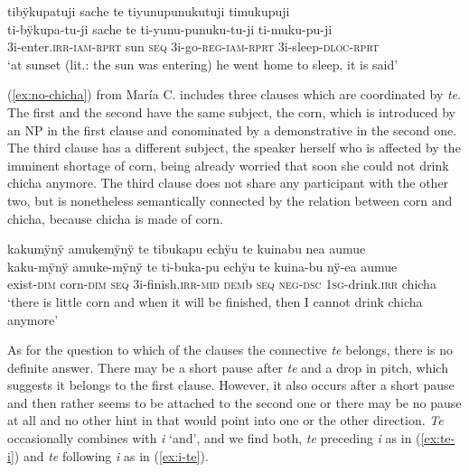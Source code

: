 \ea\label{ex:sunset}
\begingl
\glpreamble tibÿkupatuji sache te tiyunupunukutuji timukupuji\\
\gla ti-bÿkupa-tu-ji sache te ti-yunu-punuku-tu-ji ti-muku-pu-ji\\
\glb 3i-enter.\textsc{irr}-\textsc{iam}-\textsc{rprt} sun \textsc{seq} 3i-go-\textsc{reg}-\textsc{iam}-\textsc{rprt} 3i-sleep-\textsc{dloc}-\textsc{rprt}\\
\glft ‘at sunset (lit.: the sun was entering) he went home to sleep, it is said’
\endgl
\trailingcitation{[mox-n110920l.043]}
\xe


(\ref{ex:no-chicha}) from María C. includes three clauses which are coordinated by \textit{te}. The first and the second have the same subject, the corn, which is introduced by an NP in the first clause and conominated by a demonstrative in the second one. The third clause has a different subject, the speaker herself who is affected by the imminent shortage of corn, being already worried that soon she could not drink chicha anymore. The third clause does not share any participant with the other two, but is nonetheless semantically connected by the relation between corn and chicha, because chicha is made of corn.

\ea\label{ex:no-chicha}
\begingl
\glpreamble kakumÿnÿ amukemÿnÿ te tibukapu echÿu te kuinabu nea aumue\\
\gla kaku-mÿnÿ amuke-mÿnÿ te ti-buka-pu echÿu te kuina-bu nÿ-ea aumue\\
\glb exist-\textsc{dim} corn-\textsc{dim} \textsc{seq} 3i-finish.\textsc{irr}-\textsc{mid} \textsc{dem}b \textsc{seq} \textsc{neg}-\textsc{dsc} 1\textsc{sg}-drink.\textsc{irr} chicha\\
\glft ‘there is little corn and when it will be finished, then I cannot drink chicha anymore’
\endgl
\trailingcitation{[ump-p110815sf.693]}
\xe

As for the question to which of the clauses the connective \textit{te} belongs, there is no definite answer. There may be a short pause after \textit{te} and a drop in pitch, which suggests it belongs to the first clause. However, it also occurs after a short pause and then rather seems to be attached to the second one or there may be no pause at all and no other hint in  that would point into one or the other direction. \textit{Te} occasionally combines with \textit{i} ‘and’, and we find both, \textit{te} preceding \textit{i} as in (\ref{ex:te-i}) and \textit{te} following \textit{i} as in (\ref{ex:i-te}).

